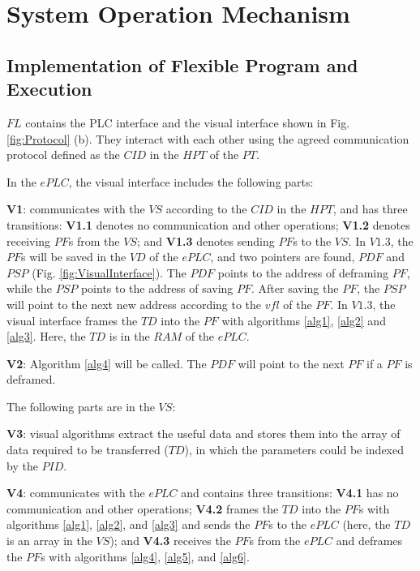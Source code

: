 \documentclass[journal,UTF8]{IEEEtran}
\begin{document}
	\section{System Operation Mechanism}
	\label{Execution}
	\subsection{Implementation of Flexible Program and Execution}
	$FL$ contains the PLC interface and the visual interface shown in Fig. \ref{fig:Protocol} (b).
	They interact with each other using the agreed communication protocol defined as the $CID$ in the $HPT$ of the $PT$. 
	
	In the $ePLC$, the visual interface includes the following parts:
	
	\textbf{V1}: communicates with the $VS$ according to the $CID$ in the $HPT$, and has three transitions: \textbf{V1.1} denotes no communication and other operations; \textbf{V1.2} denotes receiving $PF$s from the $VS$; and \textbf{V1.3} denotes sending $PF$s to the $VS$. In $V1.3$, the $PF$s will be saved in the $VD$ of the $ePLC$, and two pointers are found, $PDF$ and $PSP$ (Fig. \ref{fig:VisualInterface}). The $PDF$ points to the address of deframing $PF$, while the $PSP$ points to the address of saving $PF$. After saving the $PF$, the $PSP$ will point to the next new address according to the $vfl$ of the $PF$. In $V1.3$, the visual interface frames the $TD$ into the $PF$ with algorithms \ref{alg1}, \ref{alg2} and \ref{alg3}. Here, the $TD$ is in the $RAM$ of the $ePLC$.
	
	\textbf{V2}: Algorithm \ref{alg4} will be called. The $PDF$ will point to the next $PF$ if a $PF$ is deframed.
	
	
	The following parts are in the $VS$:
	
	\textbf{V3}: visual algorithms extract the useful data and stores them into the array of data required to be transferred ($TD$), in which the parameters could be indexed by the $PID$.
	
	\textbf{V4}: communicates with the $ePLC$ and contains three transitions: \textbf{V4.1} has no communication and other operations; \textbf{V4.2} frames the $TD$ into the $PF$s with algorithms \ref{alg1}, \ref{alg2}, and \ref{alg3} and sends the $PF$s to the $ePLC$ (here, the $TD$ is an array in the $VS$); and \textbf{V4.3} receives the $PF$s from the $ePLC$ and deframes the $PF$s with algorithms \ref{alg4}, \ref{alg5}, and \ref{alg6}.
	
\end{document}

